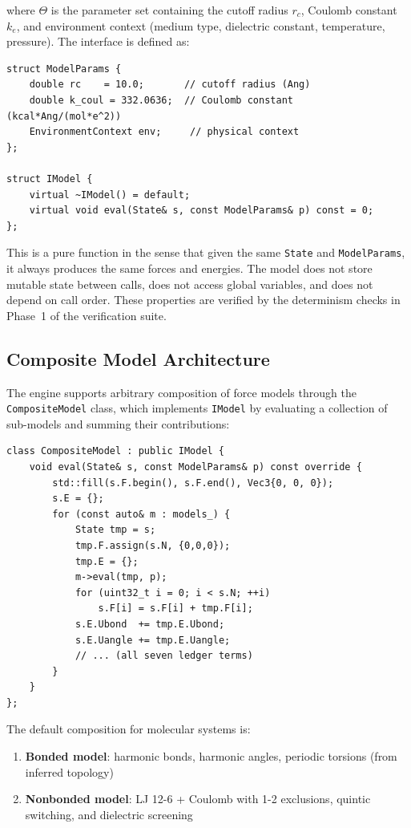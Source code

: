 \documentclass[11pt,twoside]{article}
\newcommand{\type}[1]{\texttt{#1}}
\begin{document}
where $\Theta$ is the parameter set containing the cutoff radius $r_c$, Coulomb constant $k_e$, and environment context (medium type, dielectric constant, temperature, pressure). The interface is defined as:

\begin{lstlisting}
struct ModelParams {
    double rc    = 10.0;       // cutoff radius (Ang)
    double k_coul = 332.0636;  // Coulomb constant (kcal*Ang/(mol*e^2))
    EnvironmentContext env;     // physical context
};

struct IModel {
    virtual ~IModel() = default;
    virtual void eval(State& s, const ModelParams& p) const = 0;
};
\end{lstlisting}

This is a pure function in the sense that given the same \type{State} and \type{ModelParams}, it always produces the same forces and energies. The model does not store mutable state between calls, does not access global variables, and does not depend on call order. These properties are verified by the determinism checks in Phase~1 of the verification suite.

\subsection{Composite Model Architecture}
\label{sec:composite}

The engine supports arbitrary composition of force models through the \type{CompositeModel} class, which implements \type{IModel} by evaluating a collection of sub-models and summing their contributions:

\begin{lstlisting}
class CompositeModel : public IModel {
    void eval(State& s, const ModelParams& p) const override {
        std::fill(s.F.begin(), s.F.end(), Vec3{0, 0, 0});
        s.E = {};
        for (const auto& m : models_) {
            State tmp = s;
            tmp.F.assign(s.N, {0,0,0});
            tmp.E = {};
            m->eval(tmp, p);
            for (uint32_t i = 0; i < s.N; ++i)
                s.F[i] = s.F[i] + tmp.F[i];
            s.E.Ubond  += tmp.E.Ubond;
            s.E.Uangle += tmp.E.Uangle;
            // ... (all seven ledger terms)
        }
    }
};
\end{lstlisting}

The default composition for molecular systems is:

\begin{enumerate}
  \item \textbf{Bonded model}: harmonic bonds, harmonic angles, periodic torsions (from inferred topology)
  \item \textbf{Nonbonded model}: LJ 12-6 + Coulomb with 1-2 exclusions, quintic switching, and dielectric screening
\end{enumerate}
\end{document}
